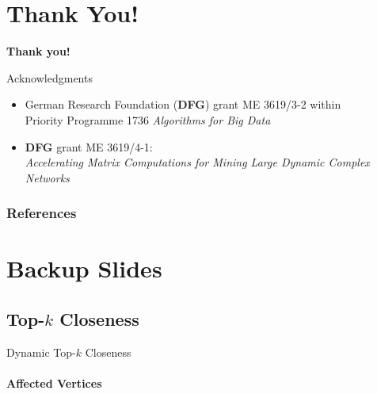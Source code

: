 \documentclass[10pt,titlepage,english,presentation]{beamer}
\newif\ifbackup
\begin{document}

\section{Thank You!}
\begin{frame}
\vfill
\begin{center}
\Huge\textbf{\textcolor{HUBblue}{Thank you!}}
\end{center}
\vfill
\scriptsize
Acknowledgments
\begin{itemize}
\scriptsize
\item German Research Foundation (\textbf{DFG}) grant ME 3619/3-2 within
\\ Priority Programme 1736 \textit{Algorithms for Big Data} \item
\textbf{DFG} grant ME 3619/4-1: \\ \textit{Accelerating Matrix
Computations for Mining Large Dynamic Complex Networks} \par
\end{itemize}

\vfill
\end{frame}

\begin{frame}[allowframebreaks]
\frametitle{References}
\printbibliography
\end{frame}

\ifbackup
\section{Backup Slides}

\subsection{Top-$k$ Closeness}

\begin{frame}[t]{Dynamic Top-$k$ Closeness}
\framesubtitle{Affected Vertices}

\tiny\centering
\setlength{\tabcolsep}{3pt}
\smallskip


\end{frame}
\end{document}
